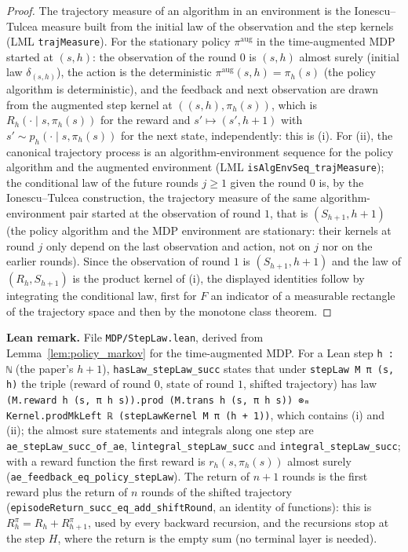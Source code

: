 \begin{proof}
\leanok
The trajectory measure of an algorithm in an environment is the Ionescu--Tulcea measure built
from the initial law of the observation and the step kernels (LML \texttt{trajMeasure}). For the
stationary policy $\pi^{\mathrm{aug}}$ in the time-augmented MDP started at $(s, h)$: the
observation of the round $0$ is $(s, h)$ almost surely (initial law $\delta_{(s, h)}$), the action
is the deterministic $\pi^{\mathrm{aug}}(s, h) = \pi_h(s)$ (the policy algorithm is deterministic),
and the feedback and next observation are drawn from the augmented step kernel at
$((s, h), \pi_h(s))$,
which is $R_h(\cdot \mid s, \pi_h(s))$ for the reward and $s' \mapsto (s', h + 1)$ with
$s' \sim p_h(\cdot \mid s, \pi_h(s))$ for the next state, independently: this is (i). For (ii), the
canonical trajectory process is an algorithm-environment sequence for the policy algorithm and
the augmented environment (LML \texttt{isAlgEnvSeq\_trajMeasure}); the conditional law of the
future rounds $j \ge 1$ given the round $0$ is, by the Ionescu--Tulcea construction, the
trajectory measure of the same algorithm-environment pair started at the observation of round
$1$, that is $(S_{h+1}, h + 1)$ (the policy algorithm and the MDP environment are stationary:
their kernels at round $j$ only depend on the last observation and action, not on $j$ nor on
the earlier rounds). Since the observation of round $1$ is $(S_{h+1}, h + 1)$ and the law of
$(R_h, S_{h+1})$ is the product kernel of (i), the displayed identities follow by integrating
the conditional law, first for $F$ an indicator of a measurable rectangle of the trajectory
space and then by the monotone class theorem.
\end{proof}

\textbf{Lean remark.} File \texttt{MDP/StepLaw.lean}, derived from
Lemma~\ref{lem:policy_markov} for the time-augmented MDP. For a Lean step \texttt{h : ℕ} (the
paper's $h + 1$), \texttt{hasLaw\_stepLaw\_succ} states that under \texttt{stepLaw M π (s, h)}
the triple (reward of round $0$, state of round $1$, shifted trajectory) has law
\texttt{(M.reward h (s, π h s)).prod (M.trans h (s, π h s)) ⊗ₘ Kernel.prodMkLeft ℝ (stepLawKernel M π (h + 1))},
which contains (i) and (ii); the almost sure statements and integrals along one step are
\texttt{ae\_stepLaw\_succ\_of\_ae}, \texttt{lintegral\_stepLaw\_succ} and
\texttt{integral\_stepLaw\_succ}; with a reward function the first reward is
$r_h(s, \pi_h(s))$ almost surely (\texttt{ae\_feedback\_eq\_policy\_stepLaw}). The return of
$n + 1$ rounds is the first reward plus the return of $n$ rounds of the shifted trajectory
(\texttt{episodeReturn\_succ\_eq\_add\_shiftRound}, an identity of functions): this is
$R^\pi_h = R_h + R^\pi_{h+1}$, used by every backward recursion, and the recursions stop at the
step $H$, where the return is the empty sum (no terminal layer is needed).

